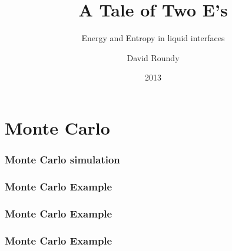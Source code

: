 \documentclass{beamer}
\title{A Tale of Two E's}
\subtitle{Energy and Entropy in liquid interfaces}
\author{David Roundy}
\date{2013}
\begin{document}
\section{Monte Carlo}

\begin{frame}
  \frametitle{Monte Carlo simulation}
  \begin{figure}[h]
    \centering
  \end{figure}
\end{frame}

\begin{frame}
  \frametitle{Monte Carlo Example}
  \begin{figure}[h]
    \centering
  \end{figure}
\end{frame}

\begin{frame}
  \frametitle{Monte Carlo Example}
  \begin{figure}[h]
    \centering
  \end{figure}
\end{frame}

\begin{frame}
  \frametitle{Monte Carlo Example}
  \begin{figure}[h]
    \centering
  \end{figure}
\end{frame}
\end{document}
